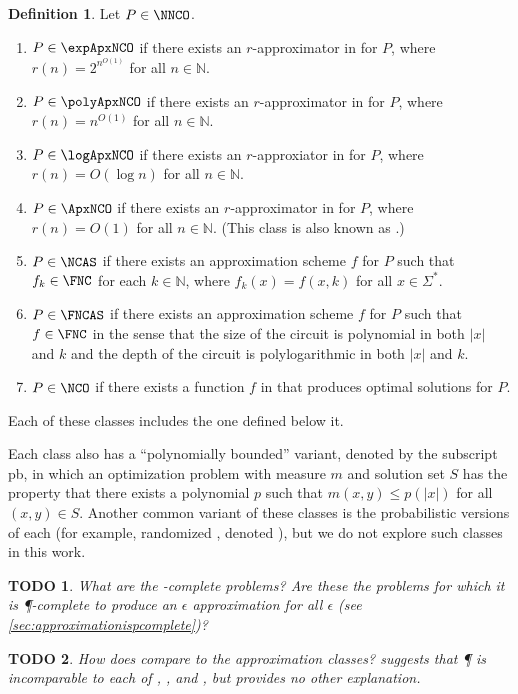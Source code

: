 \documentclass[]{article}
\theoremstyle{plain}
\newtheorem{todo}{TODO}
\theoremstyle{definition}
\newtheorem{definition}{Definition}
\newcommand{\pb}{\textsf{pb}}
\begin{document}
\begin{definition}
  Let $P\in\NNCO$.
  \begin{enumerate}
  \item $P\in\expApxNCO$ if there exists an $r$-approximator in \FNC{} for $P$, where $r(n)=2^{n^{O(1)}}$ for all $n\in\mathbb{N}$.
  \item $P\in\polyApxNCO$ if there exists an $r$-approximator in \FNC{} for $P$, where $r(n)=n^{O(1)}$ for all $n\in\mathbb{N}$.
  \item $P\in\logApxNCO$ if there exists an $r$-approxiator in \FNC{} for $P$, where $r(n)=O(\log n)$ for all $n\in\mathbb{N}$.
  \item $P\in\ApxNCO$ if there exists an $r$-approximator in \FNC{} for $P$, where $r(n)=O(1)$ for all $n\in\mathbb{N}$.
    (This class is also known as \NCX.)
  \item $P\in\NCAS$ if there exists an approximation scheme $f$ for $P$ such that $f_k\in\FNC$ for each $k\in\mathbb{N}$, where $f_k(x)=f(x, k)$ for all $x\in\Sigma^*$.
  \item $P\in\FNCAS$ if there exists an approximation scheme $f$ for $P$ such that $f\in\FNC$ in the sense that the size of the circuit is polynomial in both $|x|$ and $k$ and the depth of the circuit is polylogarithmic in both $|x|$ and $k$.
  \item $P\in\NCO$ if there exists a function $f$ in \FNC{} that produces optimal solutions for $P$.
  \end{enumerate}
\end{definition}

Each of these classes includes the one defined below it.

Each class also has a ``polynomially bounded'' variant, denoted by the subscript \pb, in which an optimization problem with measure $m$ and solution set $S$ has the property that there exists a polynomial $p$ such that $m(x, y) \leq p(|x|)$ for all $(x, y)\in S$.
Another common variant of these classes is the probabilistic versions of each (for example, randomized \NCAS{}, denoted \RNCAS), but we do not explore such classes in this work.

\begin{todo}
  What are the \PO-complete problems?
  Are these the problems for which it is \P-complete to produce an $\epsilon$ approximation for all $\epsilon$ (see \autoref{sec:approximationispcomplete})?
\end{todo}

\begin{todo}
  How does \PO{} compare to the \NC{} approximation classes?
  \cite[Figure~2.2]{dsst97} suggests that \P{} is incomparable to each of \FNCAS, \NCAS, and \ApxNCO, but provides no other explanation.
\end{todo}
\end{document}
